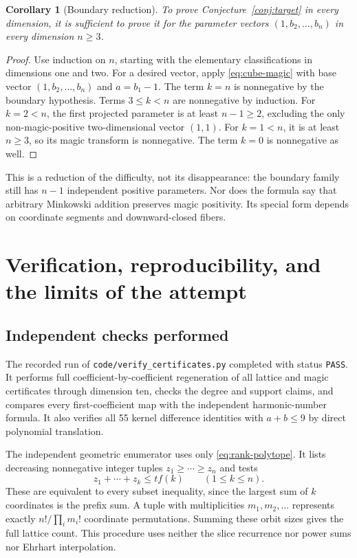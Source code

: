 \documentclass[11pt]{article}
\newtheorem{corollary}[theorem]{Corollary}
\theoremstyle{definition}
\numberwithin{equation}{section}
\begin{document}
\begin{corollary}[Boundary reduction]
\label{cor:boundary}
To prove Conjecture~\ref{conj:target} in every dimension, it is sufficient
to prove it for the parameter vectors $(1,b_2,\ldots,b_n)$ in every
dimension $n\ge3$.
\end{corollary}
\begin{proof}
Use induction on $n$, starting with the elementary classifications in
dimensions one and two. For a desired vector, apply
\eqref{eq:cube-magic} with base vector $(1,b_2,\ldots,b_n)$ and
$a=b_1-1$. The term $k=n$ is nonnegative by the boundary hypothesis.
Terms $3\le k<n$ are nonnegative by induction. For $k=2<n$, the first
projected parameter is at least $n-1\ge2$, excluding the only
non-magic-positive two-dimensional vector $(1,1)$. For $k=1<n$, it is
at least $n\ge3$, so its magic transform is nonnegative. The term $k=0$
is nonnegative as well.
\end{proof}

This is a reduction of the difficulty, not its disappearance: the boundary
family still has $n-1$ independent positive parameters. Nor does the formula
say that arbitrary Minkowski addition preserves magic positivity. Its
special form depends on coordinate segments and downward-closed fibers.

\section{Verification, reproducibility, and the limits of the attempt}
\label{sec:verification}

\subsection{Independent checks performed}
The recorded run of \texttt{code/verify\_certificates.py} completed with
status \texttt{PASS}. It performs full coefficient-by-coefficient
regeneration of all lattice and magic certificates through dimension ten,
checks the degree and support claims, and compares every first-coefficient
map with the independent harmonic-number formula. It also verifies all 55
kernel difference identities with $a+b\le9$ by direct polynomial
translation.

The independent geometric enumerator uses only
\eqref{eq:rank-polytope}. It lists decreasing nonnegative integer tuples
$z_1\ge\cdots\ge z_n$ and tests
\[
 z_1+\cdots+z_k\le t f(k)\qquad(1\le k\le n).
\]
These are equivalent to every subset inequality, since the largest sum
of $k$ coordinates is the prefix sum. A tuple with multiplicities
$m_1,m_2,\ldots$ represents exactly $n!/\prod_i m_i!$ coordinate
permutations. Summing these orbit sizes gives the full lattice count.
This procedure uses neither the slice recurrence nor power sums nor
Ehrhart interpolation.
\end{document}
